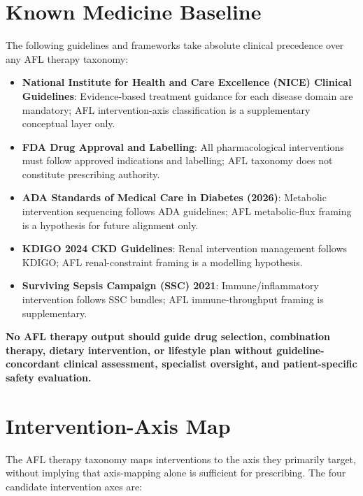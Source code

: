\documentclass[12pt,a4paper]{article}
\begin{document}
\section{Known Medicine Baseline}

The following guidelines and frameworks take absolute clinical precedence over any AFL therapy taxonomy:
\begin{itemize}
  \item \textbf{National Institute for Health and Care Excellence (NICE) Clinical Guidelines}: Evidence-based treatment guidance for each disease domain are mandatory; AFL intervention-axis classification is a supplementary conceptual layer only.
  \item \textbf{FDA Drug Approval and Labelling}: All pharmacological interventions must follow approved indications and labelling; AFL taxonomy does not constitute prescribing authority.
  \item \textbf{ADA Standards of Medical Care in Diabetes (2026)}: Metabolic intervention sequencing follows ADA guidelines; AFL metabolic-flux framing is a hypothesis for future alignment only.
  \item \textbf{KDIGO 2024 CKD Guidelines}: Renal intervention management follows KDIGO; AFL renal-constraint framing is a modelling hypothesis.
  \item \textbf{Surviving Sepsis Campaign (SSC) 2021}: Immune/inflammatory intervention follows SSC bundles; AFL immune-throughput framing is supplementary.
\end{itemize}

\textbf{No AFL therapy output should guide drug selection, combination therapy, dietary intervention, or lifestyle plan without guideline-concordant clinical assessment, specialist oversight, and patient-specific safety evaluation.}

\section{Intervention-Axis Map}

The AFL therapy taxonomy maps interventions to the axis they primarily target, without implying that axis-mapping alone is sufficient for prescribing. The four candidate intervention axes are:
\end{document}
